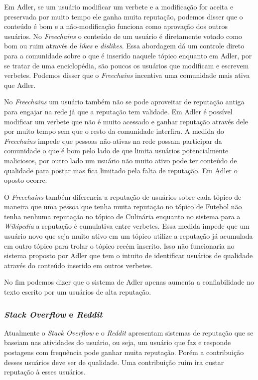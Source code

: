 \documentclass[12pt]{article}
\newcommand{\FC} {\textit{Freechains}\xspace}
\begin{document}
Em Adler, se um usuário modificar um verbete e a modificação for aceita e preservada por muito tempo ele ganha muita reputação, podemos disser que o conteúdo é bom e a não-modificação funciona como aprovação dos outros usuários.
No \FC o conteúdo de um usuário é diretamente votado como bom ou ruim através de \textit{likes} e \textit{dislikes}. 
Essa abordagem dá um controle direto para a comunidade sobre o que é inserido naquele tópico enquanto em Adler, por se tratar de uma enciclopédia, são poucos os usuários que modificam e escrevem verbetes.
Podemos disser que o \FC incentiva uma comunidade mais ativa que Adler.

No \FC um usuário também não se pode aproveitar de reputação antiga para engajar na rede já que a reputação tem validade.
Em Adler é possível modificar um verbete que não é muito acessado e ganhar reputação através dele por muito tempo sem que o resto da comunidade interfira.
A medida do \FC impede que pessoas não-ativas na rede possam participar da comunidade o que é bom pelo lado de que limita usuários potencialmente maliciosos, por outro lado um usuário não muito ativo pode ter conteúdo de qualidade para postar mas fica limitado pela falta de reputação.
Em Adler o oposto ocorre.

O \FC também diferencia a reputação de usuários sobre cada tópico de maneira que uma pessoa que tenha muita reputação no tópico de Futebol não tenha nenhuma reputação no tópico de Culinária enquanto no sistema para a \textit{Wikipedia} a reputação é cumulativa entre verbetes.
Essa medida impede que um usuário novo que seja muito ativo em um tópico utilize a reputação já acumulada em outro tópico para trolar o tópico recém inscrito.
Isso não funcionaria no sistema proposto por Adler que tem o intuito de identificar usuários de qualidade através do conteúdo inserido em outros verbetes.

No fim podemos dizer que o sistema de Adler apenas aumenta a confiabilidade no texto escrito por um usuários de alta reputação.


\subsubsection{\textit{Stack Overflow} e \textit{Reddit}} \label{subsub:stackoverflowreddit}

Atualmente o \textit{Stack Overflow} e o \textit{Reddit} apresentam  sistemas de reputação que se baseiam nas atividades do usuário, ou seja, um usuário que faz e responde postagens com frequência pode ganhar muita reputação.
Porém a contribuição desses usuários deve ser de qualidade.
Uma contribuição ruim ira custar reputação à esses usuários.
\end{document}
